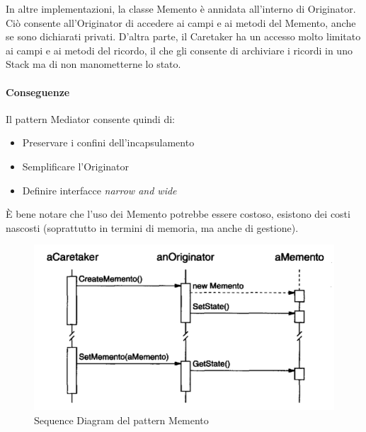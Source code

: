 In altre implementazioni, la classe Memento è annidata all'interno di Originator. Ciò consente all'Originator di accedere ai campi e ai metodi del Memento, anche se sono dichiarati privati. D'altra parte, il Caretaker ha un accesso molto limitato ai campi e ai metodi del ricordo, il che gli consente di archiviare i ricordi in uno Stack ma di non manometterne lo stato.

\paragraph{Conseguenze} Il pattern Mediator consente quindi di:
\begin{itemize}
    \item Preservare i confini dell'incapsulamento
    \item Semplificare l'Originator
    \item Definire interfacce \textit{narrow and wide}
\end{itemize}

È bene notare che l'uso dei Memento potrebbe essere costoso, esistono dei costi nascosti (soprattutto in termini di memoria, ma anche di gestione).

\begin{figure}[H]
    \centering
    \includegraphics[width=0.75\linewidth]{assets/pattern/memento/memento-sequence.png}
    \caption{Sequence Diagram del pattern Memento}
\end{figure}

\newpage